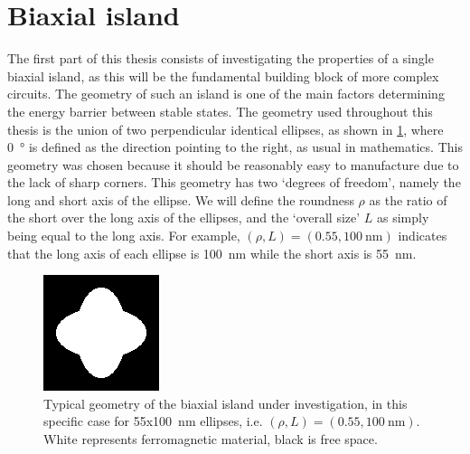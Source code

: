 \documentclass[12pt,a4paper]{article}
\begin{document}
\section{Biaxial island}
\label{par:Biaxial_island}
The first part of this thesis consists of investigating the properties of a single biaxial island, as this will be the fundamental building block of more complex circuits. The geometry of such an island is one of the main factors determining the energy barrier between stable states. The geometry used throughout this thesis is the union of two perpendicular identical ellipses, as shown in \cref{fig:biaxial_island:geometryTypical}, where \SI{0}{\degree} is defined as the direction pointing to the right, as usual in mathematics. This geometry was chosen because it should be reasonably easy to manufacture due to the lack of sharp corners. This geometry has two `degrees of freedom', namely the long and short axis of the ellipse. We will define the roundness $\rho$ as the ratio of the short over the long axis of the ellipses, and the `overall size' $L$ as simply being equal to the long axis. For example, $(\rho, L)=(0.55, \SI{100}{\nano\metre})$ indicates that the long axis of each ellipse is \SI{100}{\nano\metre} while the short axis is \SI{55}{\nano\metre}.
\begin{figure}
    \centering
    \includegraphics[width=0.3\columnwidth]{Figures/biaxial_island/Geometry/geomPlus55.png}
    \caption{Typical geometry of the biaxial island under investigation, in this specific case for 55x\SI{100}{\nano\metre} ellipses, i.e. $(\rho, L)=(0.55, \SI{100}{\nano\metre})$. White represents ferromagnetic material, black is free space.}
    \label{fig:biaxial_island:geometryTypical}
\end{figure}
\end{document}
